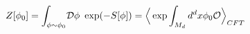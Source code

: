 \begin{equation}
Z[\phi_0]=\displaystyle{\int_{\phi\sim\phi_0}} {\cal D} \phi~\exp(-S[\phi])=\Big<\exp\int_{M_d} d^dx \phi_0 {\cal O}\Big>_{CFT}
\label{adscft}
\end{equation}


